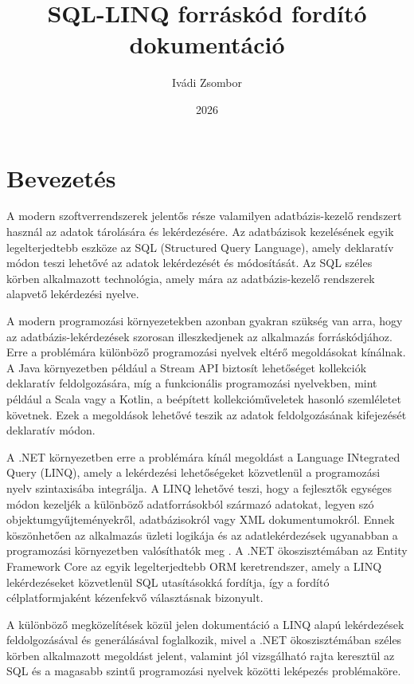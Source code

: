 \documentclass[a4paper,12pt]{article}
\title{SQL-LINQ forráskód fordító dokumentáció}
\author{Ivádi Zsombor}
\date{2026}
\begin{document}
\maketitle

\tableofcontents

\newpage

\section{Bevezetés}

A modern szoftverrendszerek jelentős része valamilyen adatbázis-kezelő rendszert használ az adatok tárolására és lekérdezésére. Az adatbázisok kezelésének egyik legelterjedtebb eszköze az SQL (Structured Query Language), amely deklaratív módon teszi lehetővé az adatok lekérdezését és módosítását. Az SQL széles körben alkalmazott technológia, amely mára az adatbázis-kezelő rendszerek alapvető lekérdezési nyelve.

A modern programozási környezetekben azonban gyakran szükség van arra, hogy az adatbázis-lekérdezések szorosan illeszkedjenek az alkalmazás forráskódjához. Erre a problémára különböző programozási nyelvek eltérő megoldásokat kínálnak. A Java környezetben például a Stream API biztosít lehetőséget kollekciók deklaratív feldolgozására, míg a funkcionális programozási nyelvekben, mint például a Scala vagy a Kotlin, a beépített kollekcióműveletek hasonló szemléletet követnek. Ezek a megoldások lehetővé teszik az adatok feldolgozásának kifejezését deklaratív módon.

A .NET környezetben erre a problémára kínál megoldást a Language INtegrated Query (LINQ), amely a lekérdezési lehetőségeket közvetlenül a programozási nyelv szintaxisába integrálja. A LINQ lehetővé teszi, hogy a fejlesztők egységes módon kezeljék a különböző adatforrásokból származó adatokat, legyen szó objektumgyűjteményekről, adatbázisokról vagy XML dokumentumokról. Ennek köszönhetően az alkalmazás üzleti logikája és az adatlekérdezések ugyanabban a programozási környezetben valósíthatók meg \cite{skeet2019csharp,freeman2010prolinq}. A .NET ökoszisztémában az Entity Framework Core az egyik legelterjedtebb ORM keretrendszer, amely a LINQ lekérdezéseket közvetlenül SQL utasításokká fordítja, így a fordító célplatformjaként kézenfekvő választásnak bizonyult.

A különböző megközelítések közül jelen dokumentáció a LINQ alapú lekérdezések feldolgozásával és generálásával foglalkozik, mivel a .NET ökoszisztémában széles körben alkalmazott megoldást jelent, valamint jól vizsgálható rajta keresztül az SQL és a magasabb szintű programozási nyelvek közötti leképezés problémaköre.
\end{document}
